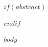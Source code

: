 \documentclass[a4paper, 11pt]{article}
\begin{document}
$if(abstract)$\begin{abstract}$abstract$\end{abstract}$endif$

$body$
\end{document}
